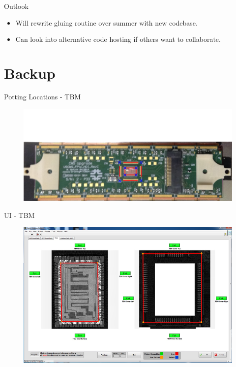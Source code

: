 \documentclass{beamer}
\begin{document}
\begin{frame}{Outlook}
\begin{itemize}
    \item Will rewrite gluing routine over summer with new codebase.
    \item Can look into alternative code hosting if others want to collaborate.
\end{itemize}
\end{frame}
    

\appendix
\section*{Backup}

\begin{frame}{Potting Locations - TBM}
\begin{figure}
    \centering
    \includegraphics[width=\textwidth]{"figures/Module Annotated - Bond Pads TBM"}
    \label{fig:module_annotated_bond_pads_tbm}
\end{figure}
\end{frame}

\begin{frame}{UI - TBM}
\begin{figure}
    \centering
    \includegraphics[width=\textwidth]{"figures/ui/review_TBM_pads"}
    \label{fig:review_tbm_pads}
\end{figure}
\end{frame}
\end{document}
